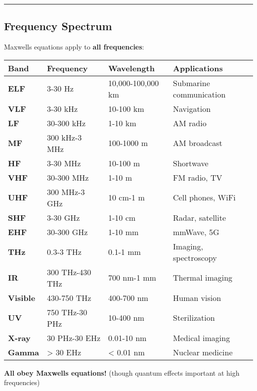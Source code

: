 \begin{center}\rule{0.5\linewidth}{0.5pt}\end{center}

\subsection{\texorpdfstring{ Frequency
Spectrum}{ Frequency Spectrum}}\label{frequency-spectrum}

Maxwell\textquotesingle s equations apply to \textbf{all frequencies}:

{\def\LTcaptype{} %
\begin{longtable}[]{@{}llll@{}}
\toprule\noalign{}
Band & Frequency & Wavelength & Applications \\
\midrule\noalign{}
\endhead
\bottomrule\noalign{}
\endlastfoot
\textbf{ELF} & 3-30 Hz & 10,000-100,000 km & Submarine communication \\
\textbf{VLF} & 3-30 kHz & 10-100 km & Navigation \\
\textbf{LF} & 30-300 kHz & 1-10 km & AM radio \\
\textbf{MF} & 300 kHz-3 MHz & 100-1000 m & AM broadcast \\
\textbf{HF} & 3-30 MHz & 10-100 m & Shortwave \\
\textbf{VHF} & 30-300 MHz & 1-10 m & FM radio, TV \\
\textbf{UHF} & 300 MHz-3 GHz & 10 cm-1 m & Cell phones, WiFi \\
\textbf{SHF} & 3-30 GHz & 1-10 cm & Radar, satellite \\
\textbf{EHF} & 30-300 GHz & 1-10 mm & mmWave, 5G \\
\textbf{THz} & 0.3-3 THz & 0.1-1 mm & Imaging, spectroscopy \\
\textbf{IR} & 300 THz-430 THz & 700 nm-1 mm & Thermal imaging \\
\textbf{Visible} & 430-750 THz & 400-700 nm & Human vision \\
\textbf{UV} & 750 THz-30 PHz & 10-400 nm & Sterilization \\
\textbf{X-ray} & 30 PHz-30 EHz & 0.01-10 nm & Medical imaging \\
\textbf{Gamma} & \textgreater{} 30 EHz & \textless{} 0.01 nm & Nuclear
medicine \\
\end{longtable}
}

\textbf{All obey Maxwell\textquotesingle s equations!} (though quantum
effects important at high frequencies)

